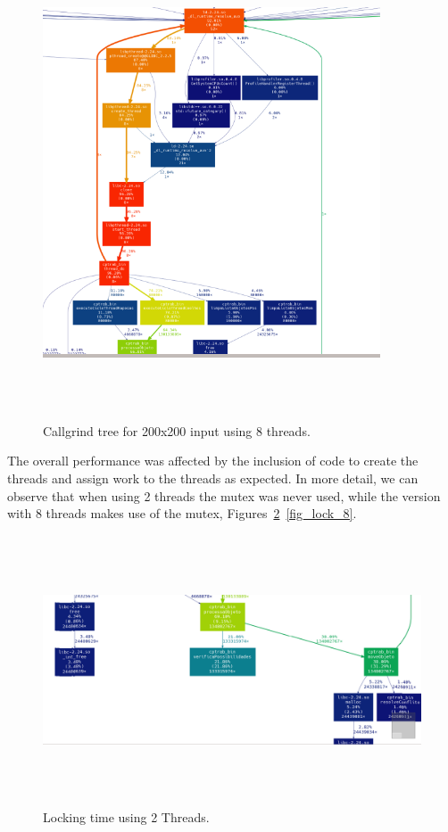 \documentclass[10pt,a4paper,final]{report}
\begin{document}
\begin{figure}[H]
      \centering
      \includegraphics[height=14cm,width=10cm]{sub_grafico_mp1_8_200x200.png}
	        
      \caption{Callgrind tree for 200x200 input using 8 threads.}
      \label{fig_call_mp1}
\end{figure}

The overall performance was affected by the inclusion of code to create the threads and assign work to the threads as expected. In more detail, we can observe that when using 2 threads the mutex was never used, while the version with 8 threads makes use of the mutex, Figures~\ref{fig_lock_2}~\ref{fig_lock_8}.

\begin{figure}[H]
      \centering
      \includegraphics[height=8cm,width=12cm]{sub_grafico_mp1_2_200x200_Lock.png}
	        
      \caption{Locking time using 2 Threads.}
      \label{fig_lock_2}
\end{figure}
\end{document}
